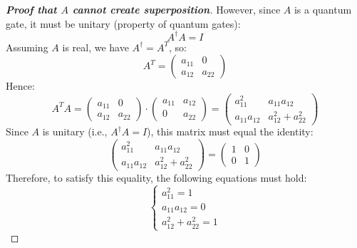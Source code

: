 \begin{proof}[\textbf{Proof that $A$ cannot create superposition}]
    \highspace
    However, since $A$ is a quantum gate, it must be unitary (property of quantum gates):
    \begin{equation*}
        A^\dagger A = I
    \end{equation*}
    Assuming $A$ is real, we have $A^\dagger = A^T$, so:
    \begin{equation*}
        A^T =
        \begin{pmatrix}
            a_{11} & 0 \\
            a_{12} & a_{22}
        \end{pmatrix}
    \end{equation*}
    Hence:
    \begin{equation*}
        A^T A
        =
        \begin{pmatrix}
            a_{11} & 0 \\
            a_{12} & a_{22}
        \end{pmatrix}
        \cdot
        \begin{pmatrix}
            a_{11} & a_{12} \\
            0      & a_{22}
        \end{pmatrix}
        =
        \begin{pmatrix}
            a_{11}^{2} & a_{11}a_{12} \\
            a_{11}a_{12} & a_{12}^{2} + a_{22}^{2}
        \end{pmatrix}
    \end{equation*}
    Since $A$ is unitary (i.e., $A^\dagger A = I$), this matrix must equal the identity:
    \begin{equation*}
        \begin{pmatrix}
            a_{11}^{2} & a_{11}a_{12} \\
            a_{11}a_{12} & a_{12}^{2} + a_{22}^{2}
        \end{pmatrix}
        =
        \begin{pmatrix}
            1 & 0 \\
            0 & 1
        \end{pmatrix}
    \end{equation*}
    Therefore, to satisfy this equality, the following equations must hold:
    \begin{equation*}
        \begin{cases}
            a_{11}^{2} = 1 \\
            a_{11}a_{12} = 0 \\
            a_{12}^{2} + a_{22}^{2} = 1

\end{cases}
\end{equation*}
\end{proof}
